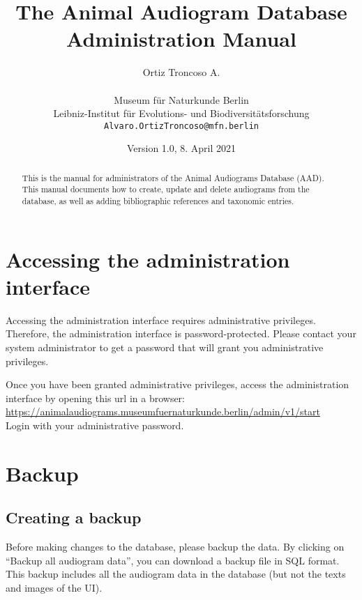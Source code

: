 \documentclass{article}
\begin{document}
\title{The Animal Audiogram Database Administration Manual}
\author{Ortiz Troncoso A.\\ \\
  Museum f{\"u}r Naturkunde Berlin\\Leibniz-Institut f{\"u}r Evolutions- und Biodiversitätsforschung\\
  \texttt{Alvaro.OrtizTroncoso@mfn.berlin}
}
\date{Version 1.0, 8. April 2021}

\maketitle

\begin{abstract}
  This is the manual for administrators of the Animal Audiograms Database (AAD). This manual documents how to create, update and delete audiograms from the database, as well as adding bibliographic references and taxonomic entries.
\end{abstract}

\newpage
\tableofcontents
\newpage

\section{Accessing the administration interface}
Accessing the administration interface requires administrative privileges. Therefore, the administration interface is password-protected. Please contact your system administrator to get a password that will grant you administrative privileges.

Once you have been granted administrative privileges, access the administration interface by opening this url in a browser:\\
\url{https://animalaudiograms.museumfuernaturkunde.berlin/admin/v1/start}\\
Login with your administrative password.

\section{Backup}
\subsection{Creating a backup}
Before making changes to the database, please backup the data. By clicking on ``Backup all audiogram data'', you can download a backup file in SQL format. This backup includes all the audiogram data in the database (but  not the texts and images of the UI).
\end{document}
